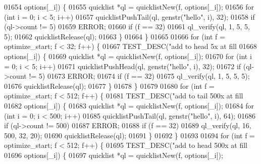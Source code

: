 \begin{DoxyCode}
{{{{{{{{{{{{{{{{{{{{{{{{{{{{{{{{{{{{{01654                       options[\_i]) \{
01655                 quicklist *ql = quicklistNew(f, options[\_i]);
01656                 \textcolor{keywordflow}{for} (\textcolor{keywordtype}{int} i = 0; i < 5; i++)
01657                     quicklistPushTail(ql, genstr(\textcolor{stringliteral}{"hello"}, i), 32);
01658                 \textcolor{keywordflow}{if} (ql->count != 5)
01659                     ERROR;
01660                 \textcolor{keywordflow}{if} (f == 32)
01661                     ql\_verify(ql, 1, 5, 5, 5);
01662                 quicklistRelease(ql);
01663             \}
01664         \}
01665 
01666         \textcolor{keywordflow}{for} (\textcolor{keywordtype}{int} f = optimize\_start; f < 32; f++) \{
01667             TEST\_DESC(\textcolor{stringliteral}{"add to head 5x at fill %
01668                       options[\_i]) \{
01669                 quicklist *ql = quicklistNew(f, options[\_i]);
01670                 \textcolor{keywordflow}{for} (\textcolor{keywordtype}{int} i = 0; i < 5; i++)
01671                     quicklistPushHead(ql, genstr(\textcolor{stringliteral}{"hello"}, i), 32);
01672                 \textcolor{keywordflow}{if} (ql->count != 5)
01673                     ERROR;
01674                 \textcolor{keywordflow}{if} (f == 32)
01675                     ql\_verify(ql, 1, 5, 5, 5);
01676                 quicklistRelease(ql);
01677             \}
01678         \}
01679 
01680         \textcolor{keywordflow}{for} (\textcolor{keywordtype}{int} f = optimize\_start; f < 512; f++) \{
01681             TEST\_DESC(\textcolor{stringliteral}{"add to tail 500x at fill %
01682                       options[\_i]) \{
01683                 quicklist *ql = quicklistNew(f, options[\_i]);
01684                 \textcolor{keywordflow}{for} (\textcolor{keywordtype}{int} i = 0; i < 500; i++)
01685                     quicklistPushTail(ql, genstr(\textcolor{stringliteral}{"hello"}, i), 64);
01686                 \textcolor{keywordflow}{if} (ql->count != 500)
01687                     ERROR;
01688                 \textcolor{keywordflow}{if} (f == 32)
01689                     ql\_verify(ql, 16, 500, 32, 20);
01690                 quicklistRelease(ql);
01691             \}
01692         \}
01693 
01694         \textcolor{keywordflow}{for} (\textcolor{keywordtype}{int} f = optimize\_start; f < 512; f++) \{
01695             TEST\_DESC(\textcolor{stringliteral}{"add to head 500x at fill %
01696                       options[\_i]) \{
01697                 quicklist *ql = quicklistNew(f, options[\_i]);
}}}}}}}}}}}}}}}}}}}}}}}}}}}}}}}}}}}}}}}}
\end{DoxyCode}

